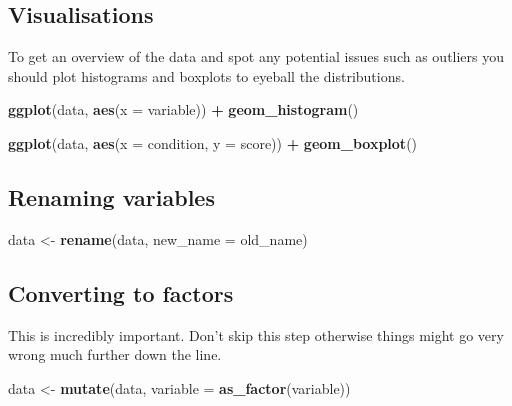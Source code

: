 \documentclass[]{book}
\newenvironment{Shaded}{\begin{snugshade}}{\end{snugshade}}
\newcommand{\DataTypeTok}[1]{\textcolor[rgb]{0.13,0.29,0.53}{#1}}
\newcommand{\KeywordTok}[1]{\textcolor[rgb]{0.13,0.29,0.53}{\textbf{#1}}}
\newcommand{\NormalTok}[1]{#1}
\newcommand{\OperatorTok}[1]{\textcolor[rgb]{0.81,0.36,0.00}{\textbf{#1}}}
\newcommand{\StringTok}[1]{\textcolor[rgb]{0.31,0.60,0.02}{#1}}
\begin{document}
\hypertarget{visualisations}{%
\subsection{Visualisations}\label{visualisations}}

To get an overview of the data and spot any potential issues such as outliers you should plot histograms and boxplots to eyeball the distributions.

\begin{Shaded}
\begin{Highlighting}[]
\KeywordTok{ggplot}\NormalTok{(data, }\KeywordTok{aes}\NormalTok{(}\DataTypeTok{x =}\NormalTok{ variable)) }\OperatorTok{+}
\StringTok{  }\KeywordTok{geom_histogram}\NormalTok{()}

\KeywordTok{ggplot}\NormalTok{(data, }\KeywordTok{aes}\NormalTok{(}\DataTypeTok{x =}\NormalTok{ condition, }\DataTypeTok{y =}\NormalTok{ score)) }\OperatorTok{+}
\StringTok{  }\KeywordTok{geom_boxplot}\NormalTok{()}
\end{Highlighting}
\end{Shaded}

\hypertarget{renaming-variables}{%
\subsection{Renaming variables}\label{renaming-variables}}

\begin{Shaded}
\begin{Highlighting}[]
\NormalTok{data <-}\StringTok{ }\KeywordTok{rename}\NormalTok{(data, }\DataTypeTok{new_name =}\NormalTok{ old_name)}
\end{Highlighting}
\end{Shaded}

\hypertarget{converting-to-factors}{%
\subsection{Converting to factors}\label{converting-to-factors}}

This is incredibly important. Don't skip this step otherwise things might go very wrong much further down the line.

\begin{Shaded}
\begin{Highlighting}[]
\NormalTok{data <-}\StringTok{ }\KeywordTok{mutate}\NormalTok{(data, }\DataTypeTok{variable =} \KeywordTok{as_factor}\NormalTok{(variable))}
\end{Highlighting}
\end{Shaded}
\end{document}
